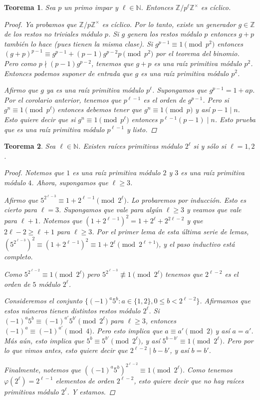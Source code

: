 \documentclass[12pt]{book}
\newtheorem{teo}{Teorema}[section]
\theoremstyle{definition}
\newcommand{\ZZ}{\mathbb{Z}}      %
\newcommand{\NN}{\mathbb{N}}
\begin{document}
\begin{teo}
Sea $p$ un primo impar y $\ell\in\NN$. Entonces $\ZZ/p^{\ell}\ZZ^\times$ es cíclico.
\begin{proof}
Ya probamos que $\ZZ/p\ZZ^\times$ es cíclico. Por lo tanto, existe un generador $g\in \ZZ$ de los restos no triviales módulo $p$. Si $g$ genera los restos módulo $p$ entonces $g+p$ también lo hace (pues tienen la misma clase). Si $g^{p-1}\equiv 1 \pmod{p^2}$ entonces $(g+p)^{p-1} \equiv g^{p-1} + (p-1)g^{p-2}p \pmod{p^2}$ por el teorema del binomio. Pero como $p\nmid (p-1)g^{p-2}$, tenemos que $g+p$ es una raíz primitiva módulo $p^2$. Entonces podemos suponer de entrada que $g$ es una raíz primitiva módulo $p^2$.

Afirmo que $g$ ya es una raíz primitiva módulo $p^\ell$. Supongamos que $g^{p-1} = 1+ap$. Por el corolario anterior, tenemos que $p^{\ell-1}$ es el orden de $g^{p-1}$. Pero si $g^n\equiv 1 \pmod{p^\ell}$ entonces debemos tener que $g^n\equiv 1\pmod{p}$ y así $p-1\mid n$.
Esto quiere decir que si $g^n \equiv 1 \pmod{p^\ell}$ entonces $p^{\ell-1}(p-1)\mid n$. Esto prueba que es una raíz primitiva módulo $p^{\ell-1}$ y listo.

\end{proof}
\end{teo}

\begin{teo}
Sea $\ell\in\NN$. Existen raíces primitivas módulo $2^\ell$ si y sólo si $\ell=1,2$.
\begin{proof}
Notemos que $1$ es una raíz primitiva módulo $2$ y $3$ es una raíz primitiva módulo $4$. Ahora, supongamos que $\ell\geq 3$.

Afirmo que $5^{2^{\ell-3}}\equiv 1 +2^{\ell-1} \pmod{2^\ell}$. Lo probaremos por inducción. Esto es cierto para $\ell=3$. Supongamos que vale para algún $\ell\geq 3$ y veamos que vale para $\ell+1$. Notemos que $(1+2^{\ell-1})^2 = 1+2^\ell + 2^{2\ell-2}$ y que $2\ell-2\geq \ell+1$ para $\ell\geq 3$. Por el primer lema de esta última serie de lemas, $(5^{2^{\ell-3}})^2 \equiv (1+2^{\ell-1})^2 \equiv 1+2^{\ell}\pmod{2^{\ell+1}}$, y el paso inductivo está completo.

Como $5^{2^{\ell-2}}\equiv 1 \pmod{2^\ell}$ pero $5^{2^{\ell-3}}\not\equiv 1\pmod{2^\ell}$ tenemos que $2^{\ell-2}$ es el orden de $5$ módulo $2^\ell$.

Consideremos el conjunto $\{(-1)^a 5^b : a\in \{1,2\} , 0\leq b<2^{\ell-2}\}$. Afirmamos que estos números tienen distintos restos módulo $2^{\ell}$. Si $(-1)^a5^b \equiv (-1)^{a'}5^{b'}\pmod{2^\ell}$ para $\ell\geq 3$, entonces $(-1)^a\equiv (-1)^{a'}\pmod{4}$. Pero esto implica que $a\equiv a'\pmod{2}$ y así $a=a'$. Más aún, esto implica que $5^b \equiv 5^{b'}\pmod{2^{\ell}}$, y así $5^{b-b'}\equiv 1\pmod{2^\ell}$. Pero por lo que vimos antes, esto quiere decir que $2^{\ell-2}\mid b-b'$, y así $b=b'$.

Finalmente, notemos que $((-1)^a 5^b)^{2^{\ell-2}}\equiv 1\pmod{2^{\ell}}$. Como tenemos $\varphi(2^{\ell})=2^{\ell-1}$ elementos de orden $2^{\ell-2}$, esto quiere decir que no hay raíces primitivas módulo $2^\ell$. Y estamos.
\end{proof}
\end{teo}
\end{document}
